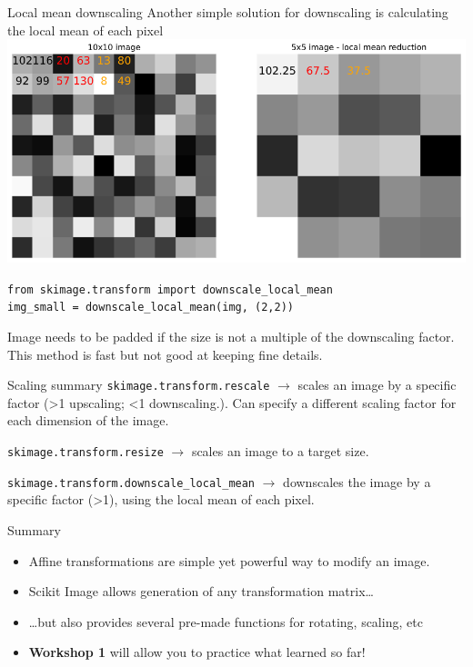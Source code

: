 \documentclass[9pt, aspectratio=169]{beamer}
\begin{document}
\begin{frame}
    {Local mean downscaling}
    Another simple solution for downscaling is calculating the local mean of each pixel
    \centering
    \includegraphics[width=.65\textwidth]{downscale.png}
    \pause
    \begin{codebox}
        \texttt{from skimage.transform import downscale\_local\_mean\\
            img\_small = downscale\_local\_mean(img, (2,2))}
    \end{codebox}

    Image needs to be padded if the size is not a multiple of the downscaling factor. This method is fast but not good at keeping fine details.
\end{frame}

\begin{frame}
    {Scaling summary}
    \texttt{skimage.transform.rescale} $\rightarrow$ scales an image by a specific factor (>1 upscaling; <1 downscaling.). Can specify a different scaling factor for each dimension of the image.
    \vspace{2em}

    \texttt{skimage.transform.resize} $\rightarrow$ scales an image to a target size.
    \vspace{2em}

    \texttt{skimage.transform.downscale\_local\_mean} $\rightarrow$ downscales the image by a specific factor (>1), using the local mean of each pixel.
\end{frame}

\begin{frame}
{Summary}
\begin{itemize}
\item Affine transformations are simple yet powerful way to modify an image.
\item Scikit Image allows generation of any transformation matrix\dots
\item \dots but also provides several pre-made functions for rotating, scaling, etc
\item \textbf{Workshop 1} will allow you to practice what learned so far!
\end{itemize}

\end{frame}
\end{document}
